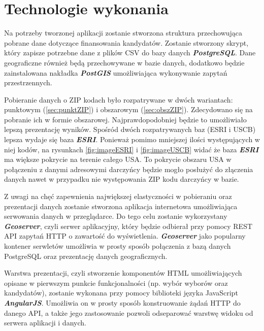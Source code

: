 \documentclass[10pt,a4paper]{article}
\begin{document}
\section{Technologie wykonania}

Na potrzeby tworzonej aplikacji zostanie stworzona struktura przechowująca pobrane dane dotyczące finansowania kandydatów. Zostanie stworzony skrypt, który zapisze potrzebne dane z plików CSV do bazy danych \textit{\textbf{PostgreSQL}}. Dane geograficzne również będą przechowywane w bazie danych, dodatkowo będzie zainstalowana nakładka \textit{\textbf{PostGIS}} umożliwiająca wykonywanie zapytań przestrzennych.

Pobieranie danych o ZIP kodach było rozpatrywane w dwóch wariantach: punktowym (\ref*{sec:punktZIP}) i obszarowym (\ref*{sec:obszZIP}). Zdecydowano się na pobranie ich w formie obszarowej. Najprawdopodobniej będzie to umożliwiało lepszą prezentację wyników. Spośród dwóch rozpatrywanych baz (ESRI i USCB) lepsza wydaje się baza \textit{\textbf{ESRI}}. Ponieważ pomimo mniejszej ilości występujących w niej kodów, na rysunkach \ref{fig:imageESRI} i \ref{fig:imageUSCB} widać że baza \textit{\textbf{ESRI}} ma większe pokrycie na terenie całego USA. To pokrycie obszaru USA w połączeniu z danymi adresowymi darczyńcy będzie mogło posłużyć do złączenia danych nawet w przypadku nie występowania ZIP kodu darczyńcy w bazie.  

Z uwagi na chęć zapewnienia największej elastyczności w pobieraniu oraz prezentacji danych zostanie stworzona aplikacja internetowa umożliwiająca serwowania danych w przeglądarce. Do tego celu zostanie wykorzystany \textit{\textbf{Geoserver}}, czyli serwer aplikacyjny, który będzie odbierał przy pomocy REST API zapytań HTTP o zawartość do wyświetlenia. \textit{\textbf{Geoserver}} jako popularny kontener serwletów umożliwia w prosty sposób połączenia z bazą danych PostgreSQL oraz prezentację danych geograficznych.

Warstwa prezentacji, czyli stworzenie komponentów HTML umożliwiających opisane w pierwszym punkcie funkcjonalności (np. wybór wyborów oraz kandydatów), zostanie wykonana przy pomocy biblioteki języka JavaScript \textit{\textbf{AngularJS}}. Umożliwia on w prosty sposób konstruowanie żądań HTTP do danego API, a także jego zastosowanie pozwoli odseparować warstwę widoku od serwera aplikacji i danych. 
\end{document}
